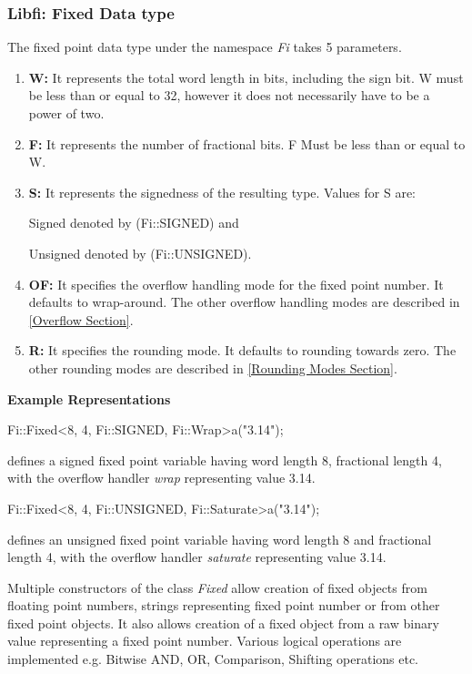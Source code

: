 \subsubsection{Libfi: Fixed Data type}
The fixed point data type under the namespace \textit{Fi} takes 5 parameters.
\begin{enumerate}
\item
\textbf{W:} It represents the total word length in bits, including the sign bit. W must be less than or equal to 32, however it does not necessarily have to be a power of two.
\item
\textbf{F:} It represents the number of fractional bits. F Must be less than or equal to W.
\item
\textbf{S:} It represents the signedness of the resulting type. Values for S are:

\noindent Signed denoted by (Fi::SIGNED) and

\noindent Unsigned denoted by (Fi::UNSIGNED).

\item
\textbf{OF:} It specifies the overflow handling mode for the fixed point number. It defaults to wrap-around. The other overflow handling modes are described in \ref{Overflow Section}. 
\item
\textbf{R:} It specifies the rounding mode. It defaults to rounding towards zero. The other rounding modes are described in \ref{Rounding Modes Section}.
\end{enumerate}
\vspace{0.5cm}
\textbf{Example Representations}

Fi::Fixed\textless8, 4, Fi::SIGNED, Fi::Wrap\textgreater a("3.14");

defines a signed fixed point variable having word length 8, fractional length 4, with the overflow handler \textit{wrap} representing value 3.14.

\vspace{0.5cm}
Fi::Fixed\textless8, 4, Fi::UNSIGNED, Fi::Saturate\textgreater a("3.14");

defines an unsigned fixed point variable having word length 8 and fractional length 4, with the overflow handler \textit{saturate} representing value 3.14.

\vspace{0.25cm}
\noindent Multiple constructors of the class \textit{Fixed} allow creation of fixed objects from floating point numbers, strings representing fixed point number or from other fixed point objects.
It also allows creation of a fixed object from a raw binary value representing a fixed point number.
Various logical operations are implemented e.g. Bitwise AND, OR, Comparison, Shifting operations etc.
